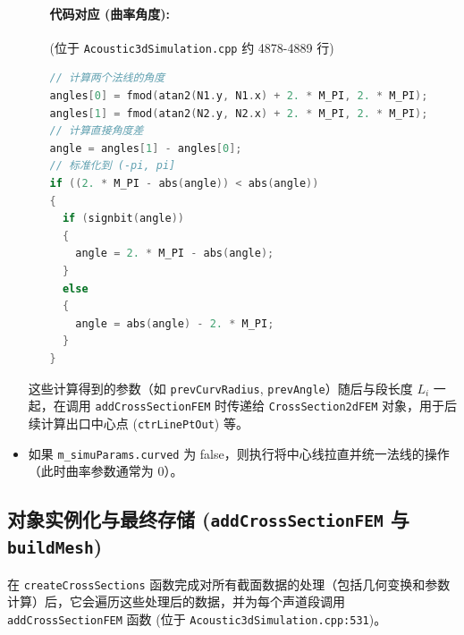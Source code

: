 \documentclass{ctexart}
\begin{document}
\begin{itemize}
\begin{itemize}
            \paragraph{代码对应 (曲率角度):} (位于 \texttt{Acoustic3dSimulation.cpp} 约 4878-4889 行)
            \begin{lstlisting}[language=C++]
// 计算两个法线的角度
angles[0] = fmod(atan2(N1.y, N1.x) + 2. * M_PI, 2. * M_PI);
angles[1] = fmod(atan2(N2.y, N2.x) + 2. * M_PI, 2. * M_PI);
// 计算直接角度差
angle = angles[1] - angles[0];
// 标准化到 (-pi, pi]
if ((2. * M_PI - abs(angle)) < abs(angle))
{
  if (signbit(angle))
  {
    angle = 2. * M_PI - abs(angle);
  }
  else
  {
    angle = abs(angle) - 2. * M_PI;
  }
}
            \end{lstlisting}
        \end{itemize}
        这些计算得到的参数（如 \texttt{prevCurvRadius}, \texttt{prevAngle}）随后与段长度 \(L_i\) 一起，在调用 \texttt{addCrossSectionFEM} 时传递给 \texttt{CrossSection2dFEM} 对象，用于后续计算出口中心点 (\texttt{ctrLinePtOut}) 等。
    \item 如果 \texttt{m\_simuParams.curved} 为 false，则执行将中心线拉直并统一法线的操作（此时曲率参数通常为 0）。
\end{itemize}

\subsection{对象实例化与最终存储 (\texttt{addCrossSectionFEM} 与 \texttt{buildMesh})}

在 \texttt{createCrossSections} 函数完成对所有截面数据的处理（包括几何变换和参数计算）后，\linebreak 它会遍历这些处理后的数据，并为每个声道段调用 \texttt{addCrossSectionFEM} 函数 (位于 \texttt{Acoustic3dSimulation.cpp:531})。
\end{document}
